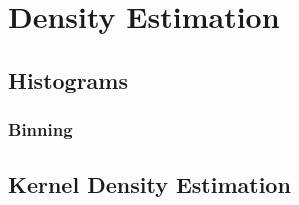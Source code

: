 \chapter{Density Estimation}\label{chap:dens_est}

\section{Histograms}\label{sec:histograms}

\subsection{Binning}\label{sec:binning}



\section{Kernel Density Estimation}\label{sec:kde}

